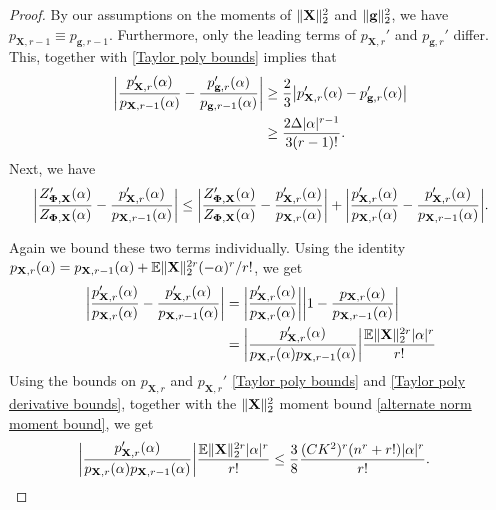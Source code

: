 \documentclass[final,12pt]{colt2018} %
\numberwithin{equation}{section}
\DeclarePairedDelimiter{\abs}{\lvert}{\rvert}
\DeclarePairedDelimiter{\norm}{\lVert}{\rVert}
\newcommand{\E}{\mathbb{E}}
\newcommand{\boldg}{\textbf{g}}
\newcommand{\boldPhi}{\boldsymbol{\Phi}}
\newcommand{\boldX}{\textbf{X}}
\begin{document}
\begin{proof}
	By our assumptions on the moments of $\norm{\boldX}_2^2$ and $\norm{\boldg}_2^2$, we have $p_{\boldX,r-1} \equiv p_{\boldg,r-1}$. Furthermore, only the leading terms of $p_{\boldX,r}'$ and $p_{\boldg,r}'$ differ. This, together with \eqref{Taylor poly bounds} implies that
	\begin{align} \label{Taylor difference}
	\abs*{\frac{p_{\boldX,r}'(\alpha)}{p_{\boldX,r-1}(\alpha)} - \frac{p_{\boldg,r}'(\alpha)}{p_{\boldg,r-1}(\alpha)}} & \geq \frac{2}{3} \abs*{p_{\boldX,r}'(\alpha) - p_{\boldg,r}'(\alpha) } \nonumber \\
	& \geq \frac{2\Delta\abs{\alpha}^{r-1}}{3(r-1)!}.
	\end{align}
	Next, we have
	\begin{align} \label{CGF remainder bound}
	\abs*{\frac{Z_{\boldPhi,\boldX}'(\alpha)}{Z_{\boldPhi,\boldX}(\alpha)} - \frac{p_{\boldX,r}'(\alpha)}{p_{\boldX,r-1}(\alpha)}} \leq \abs*{\frac{Z_{\boldPhi,\boldX}'(\alpha)}{Z_{\boldPhi,\boldX}(\alpha)} - \frac{p_{\boldX,r}'(\alpha)}{p_{\boldX,r}(\alpha)}} + \abs*{\frac{p_{\boldX,r}'(\alpha)}{p_{\boldX,r}(\alpha)} - \frac{p_{\boldX,r}'(\alpha)}{p_{\boldX,r-1}(\alpha)}}.
	\end{align}
	
	Again we bound these two terms individually. Using the identity $p_{\boldX,r}(\alpha) = p_{\boldX,r-1}(\alpha) + \E\norm{\boldX}_2^{2r}(-\alpha)^r/r!$, we get
	\begin{align}
	\abs*{\frac{p_{\boldX,r}'(\alpha)}{p_{\boldX,r}(\alpha)} - \frac{p_{\boldX,r}'(\alpha)}{p_{\boldX,r-1}(\alpha)}} & = \abs*{\frac{p_{\boldX,r}'(\alpha)}{p_{\boldX,r}(\alpha)}}\abs*{1- \frac{p_{\boldX,r}(\alpha)}{p_{\boldX,r-1}(\alpha)}} \nonumber \\
	& = \abs*{\frac{p'_{\boldX,r}(\alpha)}{p_{\boldX,r}(\alpha)p_{\boldX,r-1}(\alpha)}}\frac{\E\norm{\boldX}_2^{2r}\abs{\alpha}^r}{r!}
	\end{align}
	Using the bounds on $p_{\boldX,r}$ and $p_{\boldX,r}'$ \eqref{Taylor poly bounds} and \eqref{Taylor poly derivative bounds}, together with the $\norm{\boldX}_2^2$ moment bound \eqref{alternate norm moment bound}, we get
	\begin{align} \label{Taylor one term off bound}
	\abs*{\frac{p'_{\boldX,r}(\alpha)}{p_{\boldX,r}(\alpha)p_{\boldX,r-1}(\alpha)}}\frac{\E\norm{\boldX}_2^{2r}\abs{\alpha}^r}{r!} & \leq \frac{3}{8}\frac{(CK^2)^r(n^r+r!)\abs{\alpha}^r}{r!}.
	\end{align}
	

\end{proof}
\end{document}
